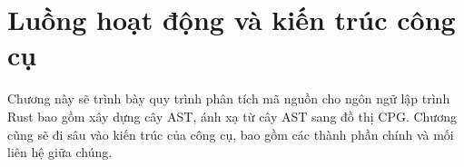 \chapter{Luồng hoạt động và kiến trúc công cụ}
\label{chap:method}

Chương này sẽ trình bày quy trình phân tích mã nguồn cho ngôn ngữ lập trình Rust bao gồm xây dựng cây AST, ánh xạ từ cây AST sang đồ thị CPG.
Chương cũng sẽ đi sâu vào kiến trúc của công cụ, bao gồm các thành phần chính và mối liên hệ giữa chúng.



